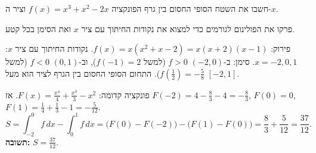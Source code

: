 
\begin{question}
חשבו את השטח הסופי החסום בין גרף הפונקציה $f(x)=x^3+x^2-2x$ וציר ה-$x$.
\end{question}

\begin{hint}
פרקו את הפולינום לגורמים כדי למצוא את נקודות החיתוך עם ציר $x$ ואת הסימן בכל קטע.
\end{hint}

\begin{solution}
פירוק: $f(x)=x(x^2+x-2)=x(x+2)(x-1)$. נקודות החיתוך עם ציר $x$: $x=-2,0,1$. סימן: ב-$(-2,0)$ $f>0$ (למשל $f(-1)=2$), וב-$(0,1)$ $f<0$ (למשל $f(\frac12)=-\frac58$). התחום הסופי החסום בין הגרף לציר הוא מעל $[-2,1]$.

פונקציה קדומה: $F(x)=\frac{x^4}{4}+\frac{x^3}{3}-x^2$. אז $F(-2)=4-\frac83-4=-\frac83$, $F(0)=0$, $F(1)=\frac14+\frac13-1=-\frac{5}{12}$.
\[ S=\int_{-2}^0 f\,dx-\int_0^1 f\,dx=\big(F(0)-F(-2)\big)-\big(F(1)-F(0)\big)=\frac83+\frac{5}{12}=\frac{37}{12}. \]
\textbf{תשובה:} $S=\frac{37}{12}$.
\end{solution}
